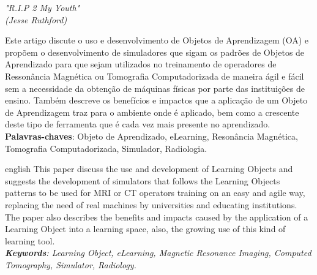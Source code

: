 \documentclass[12pt,openright,oneside,a4paper,english,french,spanish,brazil]{unifil}
\begin{document}

\begin{epigrafe}
\vspace*{\fill}
\begin{flushright}
\textit{"R.I.P 2 My Youth" \\
(Jesse Ruthford)}
\end{flushright}
\end{epigrafe}

\par
\begin{resumo}
Este artigo discute o uso e desenvolvimento de Objetos de Aprendizagem (OA) e propõem o desenvolvimento de simuladores que sigam os padrões de Objetos de Aprendizado para que sejam utilizados no treinamento de operadores de Ressonância Magnética ou Tomografia Computadorizada de maneira ágil e fácil sem a necessidade da obtenção de máquinas físicas por parte das instituições de ensino. Também descreve os benefícios e impactos que a aplicação de um Objeto de Aprendizagem traz para o ambiente onde é aplicado, bem como a crescente deste tipo de ferramenta que é cada vez mais presente no aprendizado.
\vspace{\onelineskip} \\
\noindent
\textbf{Palavras-chaves}: Objeto de Aprendizado, eLearning, Resonância Magnética, Tomografia Computadorizada, Simulador, Radiologia.
\end{resumo}

\par
\begin{resumo}[Abstract]
\begin{otherlanguage*}{english}
This paper discuss the use and development of Learning Objects and suggests the development of simulators that follows the Learning Objects patterns to be used for MRI or CT operators training on an easy and agile way, replacing the need of real machines by universities and educating institutions. The paper also describes the benefits and impacts caused by the application of a Learning Object into a learning space, also, the growing use of this kind of learning tool.
\emph{
}
\vspace{\onelineskip}\\
\noindent
\emph{	
\textbf{Keywords}: Learning Object, eLearning, Magnetic Resonance Imaging, Computed Tomography, Simulator, Radiology.
}
\end{otherlanguage*}
\end{resumo}
\end{document}
